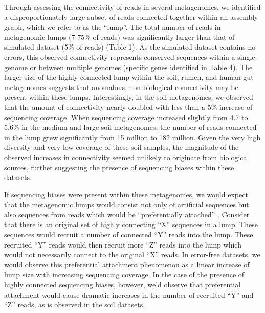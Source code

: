 \documentclass[10pt]{article}
\begin{document}
Through assessing the connectivity of reads in several metagenomes, we
identified a disproportionately large subset of reads
connected together within an assembly graph, which we refer to as
the ``lump''.
The total number of reads in
metagenomic lumps (7-75\% of reads) was significantly larger than that
of simulated dataset (5\% of reads) (Table 1).  As the simulated
dataset contains no errors, this observed connectivity represents
conserved sequences within a single genome or between multiple genomes
(specific genes identified in Table 4).  The larger size of the highly
connected lump within the soil, rumen, and human gut metagenomes
suggests that anomalous, non-biological connectivity may be present
within these lumps.  Interestingly, in the soil metagenomes, we
observed that the amount of connectivity nearly doubled with less than
a 5\% increase of sequencing coverage.  When sequencing coverage
increased slightly from 4.7 to 5.6\% in the medium and large soil
metagenomes, the number of reads connected in the lump grew
significantly from 15 million to 182 million.  Given the very high
diversity and very low coverage of these soil samples, the magnitude of the
observed increases in connectivity seemed unlikely to originate from biological
sources, further suggesting the presence of sequencing biases within
these datasets.

If sequencing biases were present within these metagenomes, we would
expect that the metagenomic lumps would consist not only of
artificial sequences but also sequences from reads which would be
``preferentially attached'' \cite{Barabasi:1999p1083}.  Consider that
there is an original set of highly connecting ``X'' sequences in a
lump.  These sequences would recruit a number of connected ``Y'' reads
into the lump.  These recruited ``Y'' reads would then recruit more
``Z'' reads into the lump which would not necessarily connect to the
original ``X'' reads.  In error-free datasets, we would observe this
preferential attachment phenomenon as a linear increase of lump size
with increasing sequencing coverage.  In the case of the presence of
highly connected sequencing biases, however, we'd observe that
preferential attachment would cause dramatic increases in the number
of recruited ``Y'' and ``Z'' reads, as is observed in the soil
datasets.
\end{document}
